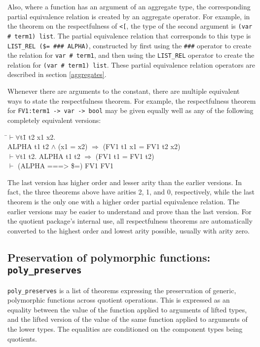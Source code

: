 \documentclass[envcountsame,runningheads]{llncs}
\newcommand{\quotient}{partial equivalence}
\begin{document}
Also, where a function has an argument of an aggregate type,
the corresponding \quotient{} relation is created by an aggregate operator.
For example, in the theorem on the respectfulness of
{\tt <[}, the
type of the second argument is
{\tt (var \# term1) list}.
The
\quotient{}
relation that corresponds to this type is
{\tt LIST\_REL (\$= \#\#\# ALPHA)},
constructed by first
using the {\tt \#\#\#} operator to create the
relation for
{\tt var \# term1},
and then using the {\tt LIST\_REL}
operator to create the
relation for
{\tt (var \# term1) list}.
These \quotient{} relation operators
are described in section \ref{aggregates}.

Whenever there are arguments to the constant, there are
multiple equivalent ways to state the respectfulness theorem.
For example, the respectfulness theorem for {\tt FV1:term1 -> var -> bool} may be given
equally well as any of the following completely equivalent versions:
{\tt \begin{tabbing}
\hspace{5.5mm}
    \=$\vdash \forall$t\=1 t2 x1 x2. \\
\>\>     ALPHA t1 t2 $\wedge$ (x1 = x2) $\Rightarrow$ (FV1 t1 x1 = FV1 t2 x2) \\
\>  $\vdash \forall$t1 t2. ALPHA t1 t2 $\Rightarrow$ (FV1 t1 = FV1 t2) \\
\>  $\vdash$ (ALPHA ===> \$=) FV1 FV1
\end{tabbing}}
The last version has higher order and lesser arity than the
earlier versions.  In fact, the three theorems above have arities
2, 1, and 0, respectively,
while the last theorem is the only one with a
higher order \quotient{} relation.
The earlier versions may be easier to understand and prove than the
last version.  For the quotient package's internal use, all respectfulness
theorems are automatically converted to the highest order and lowest
arity possible, usually with arity zero.


%
\subsection{
Preservation
of polymorphic functions: {\tt poly\_preserves}}
%
\label{polypreserves}

{\tt poly\_preserves} is a list of theorems expressing the preservation
of generic, polymorphic functions across quotient operations.
This is expressed as an
equality between the value of the function applied to arguments of
lifted types, and the lifted version of the value of the same function
applied to arguments of the lower types.
The equalities are conditioned on the component types being quotients.
\end{document}
